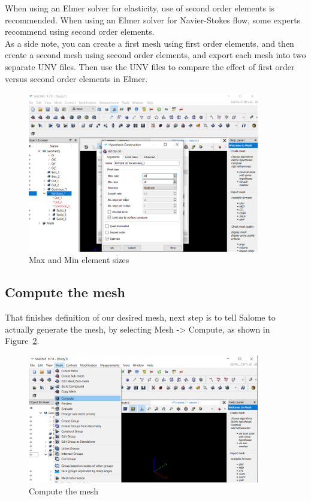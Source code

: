 When using an Elmer solver for elasticity, use of second order elements is recommended.  When using an Elmer solver for Navier-Stokes flow, some experts recommend using second order elements.\\

As a side note, you can create a first mesh using first order elements, and then create a second mesh using second order elements, and export each mesh into two separate UNV files.  Then use the UNV files to compare the effect of first order versus second order elements in Elmer.

\begin{figure}[H]
\centering
\includegraphics[width=0.9\textwidth]{Salome-21}
\caption{Max and Min element sizes}\label{fg:salome-21}
\end{figure}

\subsection{Compute the mesh}

That finishes definition of our desired mesh, next step is to tell Salome to actually generate the mesh, by selecting Mesh -> Compute, as shown in Figure~\ref{fg:salome-22}.

\begin{figure}[H]
\centering
\includegraphics[width=0.9\textwidth]{Salome-22}
\caption{Compute the mesh}\label{fg:salome-22}
\end{figure}

